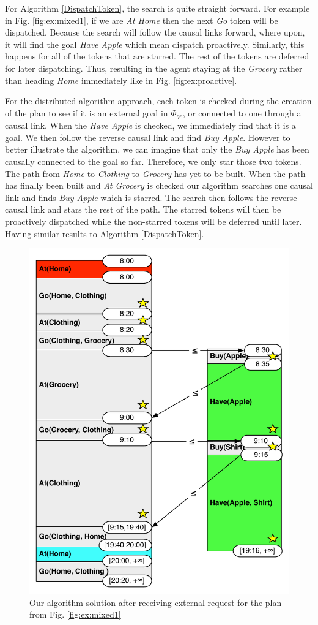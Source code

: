 For Algorithm \ref{DispatchToken}, the search is quite straight forward. For example in Fig. \ref{fig:ex:mixed1},
if we are {\em At Home} then the next {\em Go} token will be dispatched. Because the search will follow 
the causal links forward, where upon, it will find the goal {\em Have Apple} which mean dispatch proactively.
Similarly, this happens for all of the tokens that are starred. The rest of the tokens are deferred
for later dispatching. Thus, resulting in the agent staying at the {\em Grocery} rather than heading {\em Home} 
immediately like in Fig. \ref{fig:ex:proactive}.

For the distributed algorithm approach, each token is checked during the creation of the plan to see if it is 
an external goal in $\Phi_{ge}$, or connected to one through a causal link. When the {\em Have Apple} 
is checked, we immediately find that it is a goal. We then follow the reverse causal link and find {\em Buy Apple}.
However to better illustrate the algorithm, we can imagine that only the {\em Buy Apple} has been 
causally connected to the goal so far. Therefore, we only star those two tokens. The path from {\em Home} 
to {\em Clothing} to {\em Grocery} has yet to be built. When the path has finally
been built and {\em At Grocery} is checked our algorithm searches one causal link and finds {\em Buy Apple}
which is starred. The search then follows the reverse causal link and stars the rest of the path. The starred tokens will
then be proactively dispatched while the non-starred tokens will be deferred until later. Having similar results to Algorithm
\ref{DispatchToken}.

\begin{figure}
  \centering
  \includegraphics[width=0.8\columnwidth]{figs/example_MixedUpdate}
  \caption{Our algorithm solution after receiving external request for the plan from Fig. \ref{fig:ex:mixed1}}
  \label{fig:ex:mixed2}
\end{figure}

